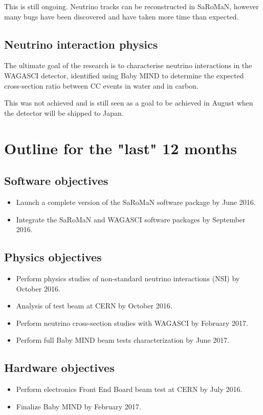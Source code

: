This is still ongoing. Neutrino tracks can be reconstructed in SaRoMaN, however many bugs have been discovered and have taken more time than expected.

\subsection{Neutrino interaction physics}
The ultimate goal of the research is to characterise neutrino interactions in the WAGASCI detector, identified using Baby MIND to determine the expected cross-section ratio between CC events in water and in carbon. 

This was not achieved and is still seen as a goal to be achieved in August when the detector will be shipped to Japan.

\section{Outline for the "last" 12 months}
\subsection{Software objectives}
\begin{itemize}
\item Launch a complete version of the SaRoMaN software package by June 2016.
\item Integrate the SaRoMaN and WAGASCI software packages by September 2016.
\end{itemize}
\subsection{Physics objectives}
\begin{itemize}
\item Perform physics studies of non-standard neutrino interactions (NSI) by October 2016.
\item Analysis of test beam at CERN by October 2016.
\item Perform neutrino cross-section studies with WAGASCI by February 2017.
\item Perform full Baby MIND beam tests characterization by June 2017.
\end{itemize}
\subsection{Hardware objectives}
\begin{itemize}
\item Perform electronics Front End Board beam test at CERN by July 2016.
\item Finalize Baby MIND by February 2017.
\end{itemize}

